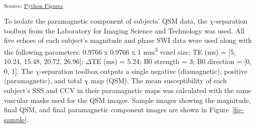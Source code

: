 \documentclass[
true
]{sn-jnl}
\begin{document}
\textsubscript{Source:
\href{https://WeberLab.github.io/Chisep_CSVO2_Manuscript/notebooks/Figures-preview.html\#cell-fig-masks}{Python
Figures}}

To isolate the paramagnetic component of subjects' QSM data, the
\(\chi\)-separation toolbox
\citep{shinHseparationMagneticSusceptibility2021} from the Laboratory
for Imaging Science and Technology was used. All five echoes of each
subject's magnitude and phase SWI data were used along with the
following parameters: 0.9766 x 0.9766 x 1 mm\textsuperscript{3} voxel
size; TE (ms) = {[}5, 10.24, 15.48, 20.72, 26.96{]}; \(\Delta\)TE (ms) =
5.24; B0 strength = 3; B0 direction = {[}0, 0, 1{]}. The
\(\chi\)-separation toolbox outputs a single negative (diamagnetic),
positive (paramagnetic), and total \(\chi\) map (QSM). The mean
susceptibility of each subject's SSS and CCV in their paramagnetic maps
was calculated with the same vascular masks used for the QSM images.
Sample images showing the magnitude, final QSM, and final paramagnetic
component images are shown in Figure~\ref{fig-sample}.
\end{document}
